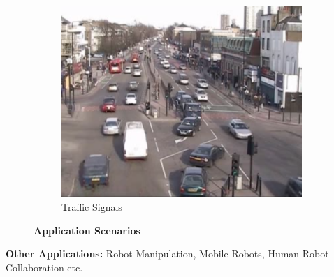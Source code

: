 \documentclass{beamer}
\begin{document}
\begin{frame}
\begin{figure}[h]
\begin{subfigure}[t]{.3\textwidth}
         	\end{subfigure}\hfill%
         	\begin{subfigure}[t]{.3\textwidth}
         		\centering
\includegraphics[width=0.98\linewidth]{images/vert_flow1.png}
         		\caption{Traffic Signals \cite{qmul_traffic}}
         		
         	\end{subfigure}
         	
         	\caption{\textbf{Application Scenarios}}
         	\label{umn_norm_ex}
         \end{figure}

\textbf{Other Applications:}  Robot Manipulation, Mobile Robots, Human-Robot Collaboration  etc.
%	

\end{frame}
\end{document}
